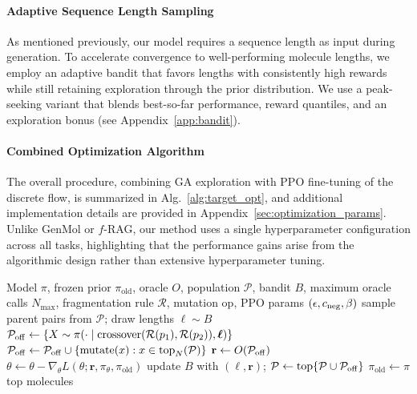 \documentclass{article} %
\begin{document}
\paragraph{Adaptive Sequence Length Sampling}
As mentioned previously, our model requires a sequence length as input during generation. To accelerate convergence to well-performing molecule lengths, we employ an adaptive bandit that favors lengths with consistently high rewards while still retaining exploration through the prior distribution. We use a peak-seeking variant that blends best-so-far performance, reward quantiles, and an exploration bonus (see Appendix~\ref{app:bandit}).
\paragraph{Combined Optimization Algorithm}
The overall procedure, combining GA exploration with PPO fine-tuning of the discrete flow, is summarized in Alg.~\ref{alg:target_opt}, and additional implementation details are provided in Appendix~\ref{sec:optimization_params}. Unlike GenMol or $f$-RAG, our method uses a single hyperparameter configuration across all tasks, highlighting that the performance gains arise from the algorithmic design rather than extensive hyperparameter tuning.
\begin{algorithm}[htbp]
\caption{Target-Property Optimization (GA + PPO)}\label{alg:target_opt}
\begin{algorithmic}
\Require Model $\pi$, frozen prior $\pi_{\text{old}}$, oracle $O$, population $\mathcal{P}$, bandit $B$, maximum oracle calls $N_{\max}$, fragmentation rule $\mathcal{R}$, mutation op, PPO params $(\epsilon, c_{\rm neg}, \beta)$
  \State sample parent pairs from $\mathcal{P}$; draw lengths $\boldsymbol{\ell}\sim B$
  \State $\mathcal{P}_{\rm off}\gets\{X\sim\pi(\cdot\mid \text{crossover}(\mathcal{R}(p_1),\mathcal{R}(p_2)),\boldsymbol{\ell})\}$
  \State $\mathcal{P}_{\rm off}\gets \mathcal{P}_{\rm off}\cup\{\text{mutate}(x): x\in \text{top}_N(\mathcal{P})\}$
  \State $\mathbf{r}\gets O(\mathcal{P}_{\rm off})$
   \State $\theta\gets\theta-\nabla_\theta L(\theta;\mathbf{r},\pi_\theta,\pi_{\text{old}})$ \EndFor
  \State update $B$ with $(\boldsymbol{\ell},\mathbf{r})$; \quad $\mathcal{P}\gets \text{top}\{\mathcal{P}\cup\mathcal{P}_{\rm off}\}$
  \State $\mathcal{\pi}_{\text{old}}\gets \mathcal{\pi}$
\EndWhile
\State \Return top molecules
\end{algorithmic}
\end{algorithm}
\end{document}
